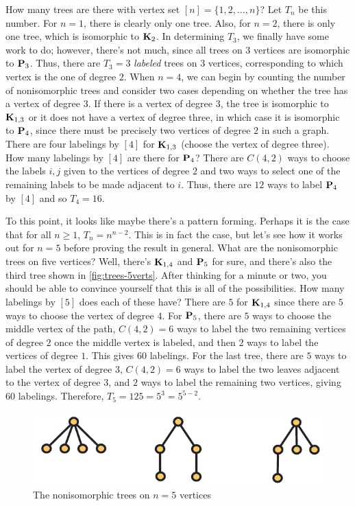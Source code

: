 How many trees are there with vertex set $[n]=\{1,2,\dots,n\}$? Let
$T_n$ be this number. For $n=1$, there is clearly only one tree. Also,
for $n=2$, there is only one tree, which is isomorphic to $\mathbf{K}_2$. In
determining $T_3$, we finally have some work to do; however, there's
not much, since all trees on $3$ vertices are isomorphic to
$\mathbf{P}_3$. Thus, there are $T_3=3$ \emph{labeled} trees on $3$
vertices, corresponding to which vertex is the one of degree $2$. When
$n=4$, we can begin by counting the number of nonisomorphic trees and
consider two cases depending on whether the tree has a vertex of
degree $3$.  If there is a vertex of degree $3$, the tree is
isomorphic to $\mathbf{K}_{1,3}$ or it does not have a vertex of degree
three, in which case it is isomorphic to $\mathbf{P}_4$, since there must be
precisely two vertices of degree $2$ in such a graph. There are four
labelings by $[4]$ for $\mathbf{K}_{1,3}$ (choose the vertex of degree
three). How many labelings by $[4]$ are there for $\mathbf{P}_4$? There are
$C(4,2)$ ways to choose the labels $i,j$ given to the vertices of
degree $2$ and two ways to select one of the remaining labels to be
made adjacent to $i$. Thus, there are $12$ ways to label $\mathbf{P}_4$ by
$[4]$ and so $T_4=16$.

To this point, it looks like maybe there's a pattern forming. Perhaps
it is the case that for all $n\geq 1$, $T_n = n^{n-2}$. This is in
fact the case, but let's see how it works out for $n=5$ before proving
the result in general. What are the nonisomorphic trees on five
vertices? Well, there's $\mathbf{K}_{1,4}$ and $\mathbf{P}_5$ for sure, and
there's also the third tree shown in \autoref{fig:trees-5verts}. After
thinking for a minute or two, you should be able to convince yourself
that this is all of the possibilities. How many labelings by $[5]$
does each of these have? There are $5$ for $\mathbf{K}_{1,4}$ since there
are $5$ ways to choose the vertex of degree $4$. For $\mathbf{P}_5$, there
are $5$ ways to choose the middle vertex of the path, $C(4,2)=6$ ways
to label the two remaining vertices of degree $2$ once the middle
vertex is labeled, and then $2$ ways to label the vertices of degree
$1$. This gives $60$ labelings. For the last tree, there are $5$ ways
to label the vertex of degree $3$, $C(4,2)=6$ ways to label the two
leaves adjacent to the vertex of degree $3$, and $2$ ways to label the
remaining two vertices, giving $60$ labelings. Therefore,
$T_5=125=5^3=5^{5-2}$.
\begin{figure}
  \centering
  \includegraphics{graphs-figs/trees-5verts}
  \caption{The nonisomorphic trees on $n=5$ vertices}
  \label{fig:trees-5verts}
\end{figure}

